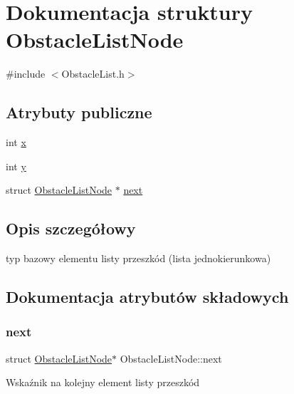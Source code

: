 \hypertarget{struct_obstacle_list_node}{}\section{Dokumentacja struktury Obstacle\+List\+Node}
\label{struct_obstacle_list_node}


{\ttfamily \#include $<$Obstacle\+List.\+h$>$}

\subsection*{Atrybuty publiczne}
\begin{DoxyCompactItemize}
\item 
int \mbox{\hyperlink{struct_obstacle_list_node_ae1f9f7db77800c94db48868a012b99bb}{x}}
\item 
int \mbox{\hyperlink{struct_obstacle_list_node_a5c26d21bb347f97eadaaeb1f1454959f}{y}}
\item 
struct \mbox{\hyperlink{struct_obstacle_list_node}{Obstacle\+List\+Node}} $\ast$ \mbox{\hyperlink{struct_obstacle_list_node_aa1f83bae8e7ee24bfa9117dcd3991adc}{next}}
\end{DoxyCompactItemize}


\subsection{Opis szczegółowy}
typ bazowy elementu listy przeszkód (lista jednokierunkowa) 

\subsection{Dokumentacja atrybutów składowych}
\mbox{\label{struct_obstacle_list_node_aa1f83bae8e7ee24bfa9117dcd3991adc}} 
\subsubsection{\texorpdfstring{next}{next}}
{\footnotesize\ttfamily struct \mbox{\hyperlink{struct_obstacle_list_node}{Obstacle\+List\+Node}}$\ast$ Obstacle\+List\+Node\+::next}

Wskaźnik na kolejny element listy przeszkód \mbox{\label{struct_obstacle_list_node_ae1f9f7db77800c94db48868a012b99bb}} 
